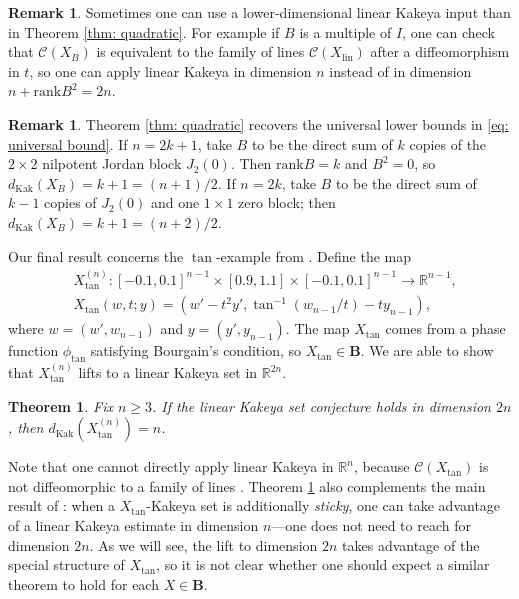 \documentclass[reqno,11pt]{amsart}
\numberwithin{equation}{section}
\numberwithin{figure}{section}
\def\R{\mathbb{R}}
\renewcommand\geq{\geqslant}
\theoremstyle{plain}
\newtheorem{theorem}[thm]{Theorem}
\theoremstyle{definition}
\newtheorem{remark}[thm]{Remark}
\newcommand{\rank}{\mathrm{rank}}
\newcommand{\Kak}{\mathrm{Kak}}
\newcommand{\lin}{\mathrm{lin}}
\begin{document}
    \begin{remark}
        Sometimes one can use a lower-dimensional linear Kakeya input than in Theorem \ref{thm: quadratic}. For example if $B$ is a multiple of $I$, one can check that $\mathcal C(X_B)$ is equivalent to the family of lines $\mathcal C(X_{\lin})$ after a diffeomorphism in $t$, so one can apply linear Kakeya in dimension $n$ instead of in dimension $n + \rank B^2 = 2n$. 
    \end{remark}

    \begin{remark}
        Theorem \ref{thm: quadratic} recovers the universal lower bounds in \ref{eq: universal bound}. If $n = 2k + 1$, take $B$ to be the direct sum of $k$ copies of the $2\times 2$ nilpotent Jordan block $J_2(0)$. Then $\rank B = k$ and $B^2 = 0$, so $d_{\Kak}(X_B) = k + 1 = (n+1)/2$. If $n = 2k$, take $B$ to be the direct sum of $k-1$ copies of $J_2(0)$ and one $1 \times 1$ zero block; then $d_\Kak(X_B) = k + 1 = (n+2)/2$.
    \end{remark}

    Our final result concerns the $\tan$-example from \cite{Nadjimzadah2026Bourgain}. Define the map 
    \begin{align}
        &X^{(n)}_{\tan} : [-0.1,0.1]^{n-1} \times [0.9,1.1] \times [-0.1,0.1]^{n-1} \to \R^{n-1}, \\
        &X_{\tan}(w,t;y) = (w'-t^2 y', \tan^{-1}(w_{n-1}/t)-ty_{n-1}), \label{eq: tan example def}
    \end{align}
    where $w=(w',w_{n-1})$ and $y=(y',y_{n-1})$.
    The map $X_{\tan}$ comes from a phase function $\phi_{\tan}$ satisfying Bourgain's condition, so $X_{\tan} \in \mathbf B$. We are able to show that $X^{(n)}_{\tan}$ lifts to a linear Kakeya set in $\R^{2n}$. 

    \begin{theorem}\label{thm: tan example main}
        Fix $n \geq 3$.
        If the linear Kakeya set conjecture holds in dimension $2n$, then $d_{\Kak}(X^{(n)}_{\tan}) = n$.
    \end{theorem}

    Note that one cannot directly apply linear Kakeya in $\R^n$, because $\mathcal C(X_{\tan})$ is not diffeomorphic to a family of lines \cite{Nadjimzadah2026Bourgain}. 
    Theorem \ref{thm: tan example main} also complements the main result of \cite{Nadjimzadah2026Bourgain}: when a $X_{\tan}$-Kakeya set is additionally \emph{sticky}, one can take advantage of a linear Kakeya estimate in dimension $n$---one does not need to reach for dimension $2n$. As we will see, the lift to dimension $2n$ takes advantage of the special structure of $X_{\tan}$, so it is not clear whether one should expect a similar theorem to hold for each $X \in \mathbf B$. 
\end{document}
